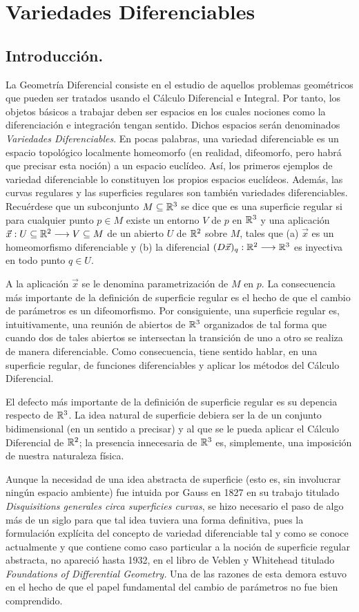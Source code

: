\documentclass[cursovd_portada.tex]{subfiles}
\begin{document}
\chapter{Variedades Diferenciables}
\section{Introducción.}
\hs La Geometría Diferencial consiste en el estudio de aquellos problemas geo\-mé\-tri\-cos que pueden ser
tratados usando el Cálculo Diferencial e Integral. Por tanto, los objetos básicos a trabajar deben ser espacios en
los cuales nociones como la diferenciación e integración tengan sentido. Dichos espacios serán denominados {\it
Variedades Diferenciables}. En pocas palabras, una variedad diferenciable es un espacio topológico localmente
homeomorfo (en realidad, difeomorfo, pero habrá que precisar esta noción) a un espacio euclídeo. Así, los primeros
ejemplos de variedad diferenciable lo constituyen los propios espacios euclídeos. Además, las curvas regulares y
las superficies regulares son también variedades diferenciables. Recuérdese que un subconjunto $M\subseteq\mathbb{R}^3$ se
dice que es una superficie regular si para cualquier punto $p\in M$ existe un entorno $V$ de $p$ en $\mathbb{R}^3$ y una
aplicación $\vec{x}:U\subseteq\mathbb{R}^2\longrightarrow V\subseteq M$ de un abierto $U$ de $\mathbb{R}^2$ sobre $M$, tales que (a) $\vec{x}$
es un homeomorfismo diferenciable y (b) la diferencial $(D\vec{x})_q:\mathbb{R}^2\longrightarrow\mathbb{R}^3$ es inyectiva en todo punto $q\in
U$.
\par
A la aplicación $\vec{x}$ se le denomina parametrización de $M$ en $p$. La consecuencia más importante de  la
definición de superficie regular es el hecho de que el cambio de parámetros es un difeomorfismo. Por consiguiente,
una superficie regular es, intuitivamente, una reunión de abiertos de $\mathbb{R}^3$ organizados de tal forma que cuando
dos de tales abiertos se intersectan la transición de uno a otro se realiza de manera diferenciable. Como
consecuencia, tiene sentido hablar, en una superficie regular, de funciones diferenciables y aplicar los métodos
del Cálculo Diferencial.
\par
El defecto más importante de la definición de superficie regular es su depencia respecto de $\mathbb{R}^3$. La idea
natural de superficie debiera ser la de un conjunto bidimensional (en un sentido a precisar) y al que se le pueda
aplicar el Cálculo Diferencial de $\mathbb{R}^2$; la presencia innecesaria de $\mathbb{R}^3$ es, simplemente, una imposición de
nuestra naturaleza física.
\par
Aunque la necesidad de una idea abstracta de superficie (esto es,
sin involucrar ningún espacio ambiente) fue intuida por Gauss
en 1827 en su trabajo titulado \emph{Disquisitions generales
circa superficies curvas}, se hizo necesario el paso de algo
más de un siglo para que tal idea tuviera una forma
definitiva, pues la formulación explícita del concepto de
variedad diferenciable tal y como se conoce actualmente y que
contiene como caso particular a la noción de superficie
regular abstracta, no apareció hasta 1932, en el libro de
Veblen y Whitehead titulado \emph{Foundations of Differential
Geometry.} Una de las razones de esta demora estuvo en el hecho
de que el papel fundamental del cambio de parámetros no fue
bien comprendido.
\end{document}

